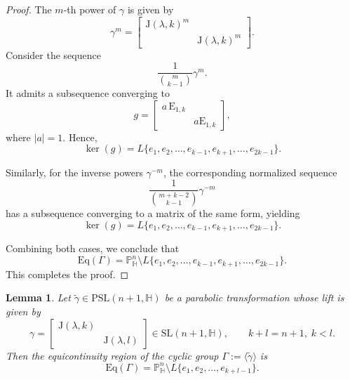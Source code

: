 \documentclass[12pt,reqno]{amsart}
\numberwithin{equation}{section}
\newtheorem{lemma}[theorem]{Lemma}
\theoremstyle{definition}
\def\H{\mathbb H}
\def\P{\mathbb P}
\def\H{\mathbb {H}}
\begin{document}
\begin{proof}
The $m$-th power of $\gamma$ is given by
\[
\gamma^m =
\begin{bmatrix}
    \mathrm{J}(\lambda, k)^m & \\
    & \mathrm{J}(\lambda, k)^m
\end{bmatrix}.
\]
Consider the sequence
\[
\frac{1}{{m \choose k-1}} \gamma^m.
\]
It admits a subsequence converging to
\[
g =
\begin{bmatrix}
    a\,\mathrm{E}_{1,k} & \\
    & a\mathrm{E}_{1,k}
\end{bmatrix},
\]
where $|a| = 1$. Hence,
\[
\ker(g) = L\{ e_1, e_2, \ldots, e_{k-1}, e_{k+1}, \ldots, e_{2k-1} \}.
\]

Similarly, for the inverse powers $\gamma^{-m}$, the corresponding normalized sequence 
\[
\frac{1}{{m + k - 2 \choose k - 1}} \gamma^{-m}
\]
has a subsequence converging to a matrix of the same form, yielding
\[
\ker(g) = L\{ e_1, e_2, \ldots, e_{k-1}, e_{k+1}, \ldots, e_{2k-1} \}.
\]

Combining both cases, we conclude that
\[
\mathrm{Eq}(\Gamma) = \P^n_\H\setminus L\{ e_1, e_2, \ldots, e_{k-1}, e_{k+1}, \ldots, e_{2k-1} \}.
\]
This completes the proof. 
\end{proof}

\begin{lemma}
\label{th:par4}
Let $\tilde{\gamma} \in \mathrm{PSL}(n+1, \mathbb{H})$ be a parabolic transformation whose lift is given by 
\[
\gamma =
\begin{bmatrix}
    \mathrm{J}(\lambda, k) & \\
    & \mathrm{J}(\lambda, l)
\end{bmatrix}
\in \mathrm{SL}(n+1, \mathbb{H}), \qquad k + l = n + 1, \; k < l.
\]
Then the equicontinuity region of the cyclic group $\Gamma := \langle \tilde{\gamma} \rangle$ is 
\[
\mathrm{Eq}(\Gamma) = \P^n_\H\setminus L\{ e_1, e_2, \ldots, e_{k+l-1} \}.
\]
\end{lemma}
\end{document}
